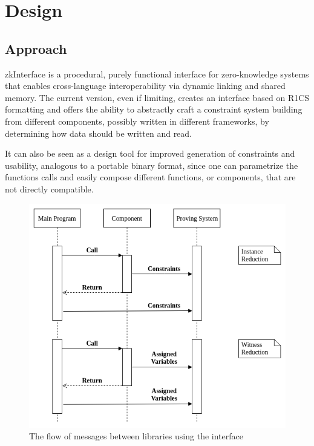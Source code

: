 \section{Design}

\subsection{Approach}


zkInterface is a procedural, purely functional interface for zero-knowledge systems that enables cross-language interoperability via dynamic linking and shared memory. The current version, even if limiting, creates an interface based on R1CS formatting and offers the ability to abstractly craft a constraint system building from different components, possibly written in different frameworks, by determining how data should be written and read. 

It can also be seen as a design tool for improved generation of constraints and usability, analogous to a portable binary format, since one can parametrize the functions calls and easily compose different functions, or components, that are not directly compatible.

\begin{figure}[h!]
	\includegraphics[width=\linewidth]{call_flow.png}
	\caption{The flow of messages between libraries using the interface}
	\label{flow}
\end{figure}


